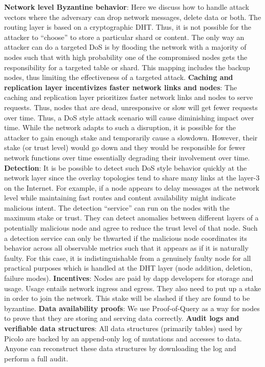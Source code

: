 \newline\newline
\textbf{Network level Byzantine behavior}: Here we discuss how to handle attack vectors where the adversary can drop network messages, delete data or both. The routing layer is based on a cryptographic DHT. Thus, it is not possible for the attacker to “choose” to store a particular shard or content. The only way an attacker can do a targeted DoS is by flooding the network with a majority of nodes such that with high probability one of the compromised nodes gets the responsibility for a targeted table or shard. This mapping includes the backup nodes, thus limiting the effectiveness of a targeted attack.
\newline\newline
\textbf{Caching and replication layer incentivizes faster network links and nodes}:
The caching and replication layer prioritizes faster network links and nodes to serve requests. Thus, nodes that are dead, unresponsive or slow will get fewer requests over time. Thus, a DoS style attack scenario will cause diminishing impact over time. While the network adapts to such a disruption, it is possible for the attacker to gain enough stake and temporarily cause a slowdown. However, their stake (or trust level) would go down and they would be responsible for fewer network functions over time essentially degrading their involvement over time.	
\newline\newline
\textbf{Detection}: It is be possible to detect such DoS style behavior quickly at the network layer since the overlay topologies tend to share many links at the layer-3 on the Internet. For example, if a node appears to delay messages at the network level while maintaining fast routes and content availability might indicate malicious intent. The detection “service” can run on the nodes with the maximum stake or trust. They can detect anomalies between different layers of a potentially malicious node and agree to reduce the trust level of that node. Such a detection service can only be thwarted if the malicious node coordinates its behavior across all observable metrics such that it appears as if it is naturally faulty. For this case, it is indistinguishable from a genuinely faulty node for all practical purposes which is handled at the DHT layer (node addition, deletion, failure modes).
\newline
\newline
\textbf{Incentives}: Nodes are paid by dapp developers for storage and usage. Usage entails network ingress and egress. They also need to put up a stake in order to join the network. This stake will be slashed if they are found to be byzantine.
\newline
\newline
\textbf{Data availability proofs}: We use Proof-of-Query as a way for nodes to prove that they are storing and serving data correctly.
\newline
\newline
\textbf{Audit logs and verifiable data structures}: All data structures (primarily tables) used by Picolo are backed by an append-only log of mutations and accesses to data. Anyone can reconstruct these data structures by downloading the log and perform a full audit.
